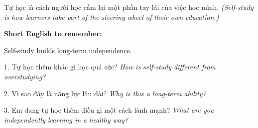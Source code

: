 \begin{baihoc}
Tự học là cách người học cầm lại một phần tay lái của việc học mình.
\textit{(Self-study is how learners take part of the steering wheel of their own education.)}
\end{baihoc}

\begin{ghinhoanh}
\textbf{Short English to remember:}

Self-study builds long-term independence.

\end{ghinhoanh}

\begin{tuhocnhanh}
1. Tự học thêm khác gì học quá sức? \textit{How is self-study different from overstudying?}

2. Vì sao đây là năng lực lâu dài? \textit{Why is this a long-term ability?}

3. Em đang tự học thêm điều gì một cách lành mạnh? \textit{What are you independently learning in a healthy way?}
\end{tuhocnhanh}
\ngancach
